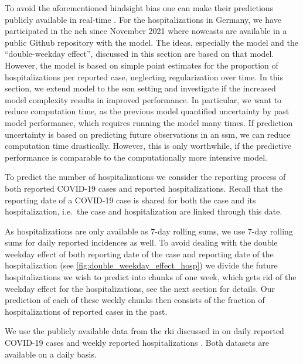 To avoid the aforementioned hindsight bias one can make their predictions publicly available in real-time \citep{Ray2020Ensemble,Bracher2021Preregistered}. For the hospitalizations in Germany, we have participated in the \gls{nch} \citep{2022Nowcasts} since November 2021 where nowcasts are available in a public Github repository \citep{2022Hospitalization} with the \ilmpropbig model. The ideas, especially the model and the ``double-weekday effect'', discussed in this section are based on that model. However, the \ilmpropbig model is based on simple point estimates for the proportion of hospitalizations per reported case, neglecting regularization over time. In this section, we extend model to the \gls{ssm} setting and investigate if the increased model complexity results in improved performance. In particular, we want to reduce computation time, as the previous model quantified uncertainty by past model performance, which requires running the model many times. If prediction uncertainty is based on predicting future observations in an \gls{ssm}, we can reduce computation time drastically. However, this is only worthwhile, if the predictive performance is comparable to the computationally more intensive model. 

To predict the number of hospitalizations we consider the reporting process of both reported COVID-19 cases and reported hospitalizations. Recall that the reporting date of a COVID-19 case is shared for both the case and its hospitalization, i.e.~the case and hospitalization are linked through this date.

As hospitalizations are only available as \(7\)-day rolling sums, we use \(7\)-day rolling sums for daily reported incidences as well. To avoid dealing with the double weekday effect of both reporting date of the case and reporting date of the hospitalization (see \cref{fig:double_weekday_effect_hosp}) we divide the future hospitalizations we wish to predict into chunks of one week, which gets rid of the weekday effect for the hospitalizations, see the next section for details. Our prediction of each of these weekly chunks then consists of the fraction of hospitalizations of reported cases in the past.

We use the publicly available data from the \gls{rki} discussed in  on daily reported COVID-19 cases \citep{RobertKoch-Institut2024SARSCoV2} and weekly reported hospitalizations \citep{RobertKoch-Institut2024COVID19Hospitalisierungen}. Both datasets are available on a daily basis.

